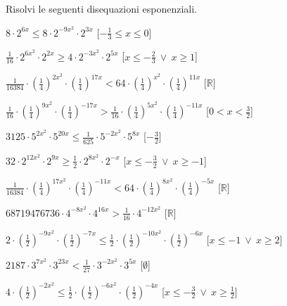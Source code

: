\begin{esercizio}\label{ese:}
 Risolvi le seguenti disequazioni esponenziali.
 \begin{enumeratea}
  \item  \(8 \cdot 2^{{6x}} \leqslant 8 \cdot 2^{{-9x^2}} \cdot 2^{{3x}}\)
   \hfill [\(-\frac{1}{3} \leqslant x \leqslant 0\)]
  \item  \(\frac{1}{16} \cdot 2^{{6x^2}} \cdot 2^{{2x}} \geqslant 4 \cdot 
2^{{-3x^2}} \cdot 2^{{5x}}\)
   \hfill [\(x \leqslant -\frac{2}{3}~\vee~x \geqslant 1\)]
  \item  \(\frac{1}{16384} \cdot \left(\frac{1}{4}\right)^{{2x^2}} \cdot 
\left(\frac{1}{4}\right)^{{17x}} < 64 \cdot \left(\frac{1}{4}\right)^{{x^2}} 
\cdot \left(\frac{1}{4}\right)^{{11x}}\)
   \hfill [\(\mathbb{R}\)]
  \item  \(\frac{1}{16} \cdot \left(\frac{1}{4}\right)^{{9x^2}} \cdot 
\left(\frac{1}{4}\right)^{{-17x}} > \frac{1}{16} \cdot 
\left(\frac{1}{4}\right)^{{5x^2}} \cdot \left(\frac{1}{4}\right)^{{-11x}}\)
   \hfill [\(0 < x < \frac{3}{2}\)]
  \item  \(3125 \cdot 5^{{2x^2}} \cdot 5^{{20x}} \leqslant \frac{1}{625} \cdot 
5^{{-2x^2}} \cdot 5^{{8x}}\)
   \hfill [\(-\frac{3}{2}\)]
  \item  \(32 \cdot 2^{{12x^2}} \cdot 2^{{9x}} \geqslant \frac{1}{2} \cdot 
2^{{8x^2}} \cdot 2^{{-x}}\)
   \hfill [\(x \leqslant -\frac{3}{2}~\vee~x \geqslant -1\)]
  \item  \(\frac{1}{16384} \cdot \left(\frac{1}{4}\right)^{{17x^2}} \cdot 
\left(\frac{1}{4}\right)^{{-11x}} < 64 \cdot \left(\frac{1}{4}\right)^{{8x^2}} 
\cdot \left(\frac{1}{4}\right)^{{-5x}}\)
   \hfill [\(\mathbb{R}\)]
  \item  \(68719476736 \cdot 4^{{-8x^2}} \cdot 4^{{16x}} > \frac{1}{16} \cdot 
4^{{-12x^2}}\)
   \hfill [\(\mathbb{R}\)]
  \item  \(2 \cdot \left(\frac{1}{2}\right)^{{-9x^2}} \cdot 
\left(\frac{1}{2}\right)^{{-7x}} \leqslant \frac{1}{2} \cdot 
\left(\frac{1}{2}\right)^{{-10x^2}} \cdot \left(\frac{1}{2}\right)^{{-6x}}\)
   \hfill [\(x \leqslant -1~\vee~x \geqslant 2\)]
  \item  \(2187 \cdot 3^{{7x^2}} \cdot 3^{{23x}} < \frac{1}{27} \cdot 
3^{{-2x^2}} \cdot 3^{{5x}}\)
   \hfill [\(\emptyset\)]
  \item  \(4 \cdot \left(\frac{1}{2}\right)^{{-2x^2}} \leqslant \frac{1}{2} 
\cdot \left(\frac{1}{2}\right)^{{-6x^2}} \cdot 
\left(\frac{1}{2}\right)^{{-4x}}\)
   \hfill [\(x \leqslant -\frac{3}{2}~\vee~x \geqslant \frac{1}{2}\)]

\end{enumeratea}
\end{esercizio}
